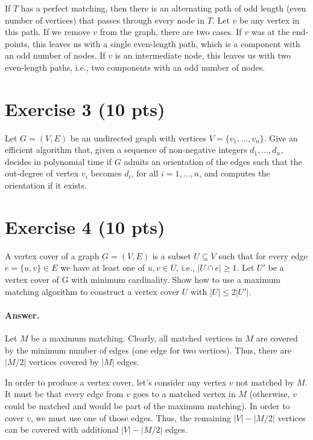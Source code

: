 \documentclass[a4paper]{article}
\begin{document}
If $T$ has a perfect matching, then there is an alternating path of odd length (even number of vertices) that passes through every node in $T$. Let $v$ be any vertex in this path. If we remove $v$ from the graph, there are two cases.
If $v$ was at the end-points, this leaves us with a single even-length path, which is a component with an odd number of nodes. If $v$ is an intermediate node, this leaves us with two even-length paths, i.e., two components with an odd number of nodes.

\section*{Exercise 3 (10 pts)}

Let $G = (V, E)$ be an undirected graph with vertices $V = \{v_1,\ldots , v_n\}$. Give an efficient algorithm that, given a sequence of non-negative integers $d_1, \ldots, d_n$, decides in polynomial time if $G$ admits an orientation of the edges such that the out-degree of vertex $v_i$ becomes $d_i$, for all $i = 1, \ldots, n$, and computes the orientation if it exists.

\section*{Exercise 4 (10 pts)}

A vertex cover of a graph $G=(V,E)$ is a subset $U \subseteq V$ such that for every edge $e=\{u,v\} \in E$ we have at least one of $u,v \in U$, i.e., $|U \cap e| \ge 1$. Let $U'$ be a vertex cover of G with minimum cardinality. Show how to use a maximum matching algorithm to construct a vertex cover $U$ with $|U| \le 2|U'|$.

\paragraph{Answer.}

Let $M$ be a maximum matching. Clearly, all matched vertices in $M$ are covered by the minimum number of edges (one edge for two vertices). Thus, there are $|M/2|$ vertices covered by $|M|$ edges.

In order to produce a vertex cover, let's consider any vertex $v$ not matched by $M$. It must be that every edge from $v$ goes to a matched vertex in $M$ (otherwise, $v$ could be matched and would be part of the maximum matching). In order to cover $v$, we must use one of those edges. Thus, the remaining $|V| - |M/2|$ vertices can be covered with additional $|V| - |M/2|$ edges.
\end{document}
